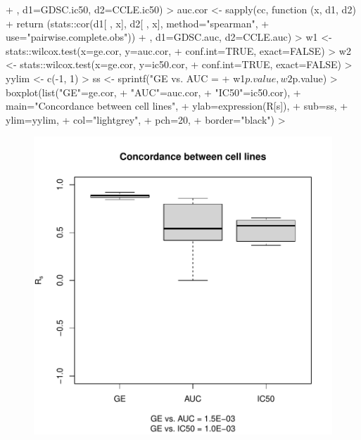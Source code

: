 \documentclass[11pt]{article}
\begin{document}
\begin{Schunk}
\begin{Sinput}
{+   }, d1=GDSC.ic50, d2=CCLE.ic50)
>   auc.cor <- sapply(cc, function (x, d1, d2) {
+     return (stats::cor(d1[ , x], d2[ , x], method="spearman",
+                 use="pairwise.complete.obs"))
+   }, d1=GDSC.auc, d2=CCLE.auc)
>   w1 <- stats::wilcox.test(x=ge.cor, y=auc.cor,
+                            conf.int=TRUE, exact=FALSE)
>   w2 <- stats::wilcox.test(x=ge.cor, y=ic50.cor,
+                            conf.int=TRUE, exact=FALSE)
>   yylim <- c(-1, 1)
>   ss <- sprintf("GE vs. AUC = %
+                 w1$p.value, w2$p.value)
>   boxplot(list("GE"=ge.cor,
+                "AUC"=auc.cor,
+                "IC50"=ic50.cor),
+           main="Concordance between cell lines",
+           ylab=expression(R[s]),
+           sub=ss,
+           ylim=yylim,
+           col="lightgrey",
+           pch=20,
+           border="black")
> 
\end{Sinput}
\end{Schunk}

\begin{figure}[hbtp]
\begin{center}
\includegraphics{PharmacoGx-fig2}
\end{center}
\label{fig:one}
\end{figure}

\end{document}
